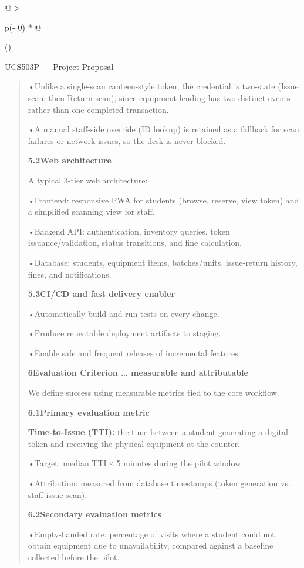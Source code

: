 \documentclass[
]{article}
\begin{document}
\begin{longtable}[]{@{}
  >{\raggedright\arraybackslash}p{(\columnwidth - 0\tabcolsep) * }@{}}
\toprule()
\begin{minipage}[b]{\linewidth}\raggedright
UCS503P --- Project Proposal

\begin{quote}
•Unlike a single-scan canteen-style token, the credential is two-state
(Issue scan, then Return scan), since equipment lending has two distinct
events rather than one completed transaction.

•A manual staff-side override (ID lookup) is retained as a fallback for
scan failures or network issues, so the desk is never blocked.

\textbf{5.2Web architecture}

A typical 3-tier web architecture:

•Frontend: responsive PWA for students (browse, reserve, view token) and
a simplified scanning view for staff.

•Backend API: authentication, inventory queries, token
issuance/validation, status transitions, and fine calculation.

•Database: students, equipment items, batches/units, issue-return
history, fines, and notifications.

\textbf{5.3CI/CD and fast delivery enabler}

•Automatically build and run tests on every change.

•Produce repeatable deployment artifacts to staging.

•Enable safe and frequent releases of incremental features.

\textbf{6Evaluation Criterion \ldots{} measurable and attributable}

We define success using measurable metrics tied to the core workflow.

\textbf{6.1Primary evaluation metric}

\textbf{Time-to-Issue (TTI):} the time between a student generating a
digital token and receiving the physical equipment at the counter.

•Target: median TTI ≤ 5 minutes during the pilot window.

•Attribution: measured from database timestamps (token generation vs.
staff issue-scan).

\textbf{6.2Secondary evaluation metrics}

•Empty-handed rate: percentage of visits where a student could not
obtain equipment due to unavailability, compared against a baseline
collected before the pilot.


\end{quote}
\end{minipage}
\end{longtable}
\end{document}
